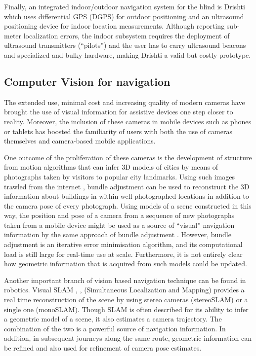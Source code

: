 Finally, an integrated indoor/outdoor navigation system for the blind is Drishti \citep{ran2004drishti} which uses differential GPS (DGPS) for outdoor positioning and an ultrasound positioning device for indoor location measurements. Although reporting sub-meter localization errors, the indoor subsystem requires the deployment of ultrasound transmitters (``pilots'') and the user has to carry ultrasound beacons and specialized and bulky hardware, making Drishti a valid but costly prototype.

\subsection{Computer Vision for navigation}

The extended use, minimal cost and increasing quality of modern cameras have brought the use of visual information for assistive devices one step closer to reality. Moreover, the inclusion of these cameras in mobile devices such as phones or tablets has boosted the familiarity of users with both the use of cameras themselves and camera-based mobile applications.

One outcome of the proliferation of these cameras is the development of structure from motion algorithms that can infer 3D models of cities \citep{agarwal2011building} by means of photographs taken by visitors to popular city landmarks. Using such images trawled from the internet \citep{snavely2006photo}, bundle adjustment can be used to reconstruct the 3D information about buildings in within well-photographed locations in addition to the camera pose of every photograph. Using models of a scene constructed in this way, the position and pose of a camera from a sequence of new photographs taken from a mobile device might be used as a source of ``visual'' navigation information by the same approach of bundle adjustment \citep{ventura2014global}.  However, bundle adjustment is an iterative error minimisation algorithm, and its computational load is still large for real-time use at scale.  Furthermore, it is not entirely clear how geometric information that is acquired from such models could be updated.

Another important branch of vision based navigation technique can be found in robotics. Visual SLAM \citep{konolige2007frame}, \citep{engelhard2011real},\citep{neira2008guest} (Simultaneous Localization and Mapping) provides a real time reconstruction of the scene by using stereo cameras (stereoSLAM) or a single one (monoSLAM). Though SLAM is often described for its ability to infer a geometric model of a scene, it also estimates a camera trajectory.  The combination of the two is a powerful source of navigation information. In addition, in subsequent journeys along the same route, geometric information can be refined and also used for refinement of camera pose estimates.

